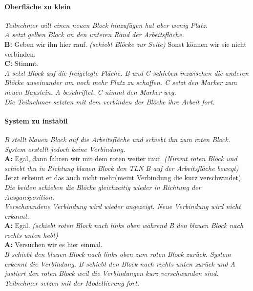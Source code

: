 \paragraph{Oberfläche zu klein} 

\begin{transkript}
\emph{Teilnehmer will einen neuen Block hinzufügen hat aber wenig Platz.} \\
\emph{A setzt gelben Block an den unteren Rand der Arbeitsfläche.} \\
\textbf{B:} Geben wir ihn hier rauf. \emph{(schiebt Blöcke zur Seite)} Sonst können wir sie nicht verbinden. \\
\textbf{C:} Stimmt. \\
\emph{A setzt Block auf die freigelegte Fläche. B und C schieben inzwischen die anderen Blöcke auseinander um noch mehr Platz zu schaffen. C setzt den Marker zum neuen Baustein. A beschriftet. C nimmt den Marker weg.} \\
\emph{Die Teilnehmer setzten mit dem verbinden der Blöcke ihre Arbeit fort.} \\
\end{transkript}

\paragraph{System zu instabil}

\begin{transkript}
\emph{B stellt blauen Block auf die Arbeitsfläche und schiebt ihn zum roten Block. System erstellt jedoch keine Verbindung.} \\
\textbf{A:} Egal, dann fahren wir mit dem roten weiter rauf. \emph{(Nimmt roten Block und schiebt ihn in Richtung blauen Block den TLN B auf der Arbeitsfläche bewegt)} Jetzt erkennt er das auch nicht mehr(meint Verbindung die kurz verschwindet). \\
\emph{Die beiden schieben die Blöcke gleichzeitig wieder in Richtung der Ausgansposition.} \\ \emph{Verschwundene Verbindung wird wieder angezeigt. Neue Verbindung wird nicht erkannt.} \\
\textbf{A:} Egal. \emph{(schiebt roten Block nach links oben während B den blauen Block nach rechts unten hebt)} \\
\textbf{A:} Versuchen wir es hier einmal. \\
\emph{B schiebt den blauen Block nach links oben zum roten Block zurück. System erkennt die Verbindung. B schiebt den Block nach rechts unten zurück und A justiert den roten Block weil die Verbindungen kurz verschwunden sind. Teilnehmer setzen mit der Modellierung fort.}
\end{transkript}

